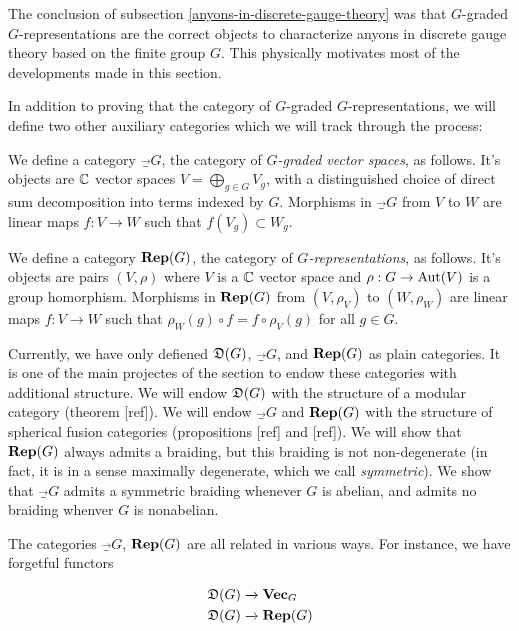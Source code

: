 \begin{rem}
The conclusion of subsection \ref{anyons-in-discrete-gauge-theory} was that $G$-graded $G$-representations are the correct objects to characterize anyons in discrete gauge theory based on the finite group $G$. This physically motivates most of the developments made in this section.
\end{rem}

In addition to proving that the category of $G$-graded $G$-representations, we will define two other auxiliary categories which we will track through the process: 

\begin{defn} We define a category $\Vec_G$, the category of {\em $G$-graded vector spaces}, as follows. It's objects are ${\mathbb C}$ vector spaces $V=\bigoplus_{g\in G}V_g$, with a distinguished choice of direct sum decomposition into terms indexed by $G$. Morphisms in $\Vec_G$  from $V$ to $W$ are linear maps $f:V\to W$ such that $f(V_g)\subset W_g$.
\end{defn}

\begin{defn} We define a category ${\bf Rep}(G)$, the category of {\em $G$-representations}, as follows. It's objects are pairs $(V,\rho)$ where $V$ is a ${\mathbb C}$ vector space and $\rho:G\to\operatorname{Aut}(V)$ is a group homorphism. Morphisms in ${\bf Rep}(G)$ from $(V,\rho_V)$ to $(W,\rho_W)$ are linear maps $f:V\to W$ such that $\rho_W(g)\circ f=f\circ\rho_V(g)$ for all $g\in G$.
\end{defn}

Currently, we have only defiened ${\mathfrak D}(G)$, $\Vec_G$, and ${\bf Rep}(G)$ as plain categories. It is one of the main projectes of the section to endow these categories with additional structure. We will endow ${\mathfrak D}(G)$  with the structure of a modular category (theorem [ref]). We will endow $\Vec_G$ and ${\bf Rep}(G)$ with the structure of spherical fusion categories (propositions [ref] and [ref]). We will show that ${\bf Rep}(G)$ always admits a braiding, but this braiding is not non-degenerate (in fact, it is in a sense maximally degenerate, which we call {\em symmetric}). We show that $\Vec_G$ admits a symmetric braiding whenever $G$ is abelian, and admits no braiding whenver $G$ is nonabelian.

The categories $\Vec_G$, ${\bf Rep}(G)$ are all related in various ways. For instance, we have forgetful functors

\begin{align*}
{\mathfrak D}(G)&\xrightarrow{}{\bf Vec}_G\\
{\mathfrak D}(G)&\xrightarrow{}{\bf Rep}(G)
\end{align*}

